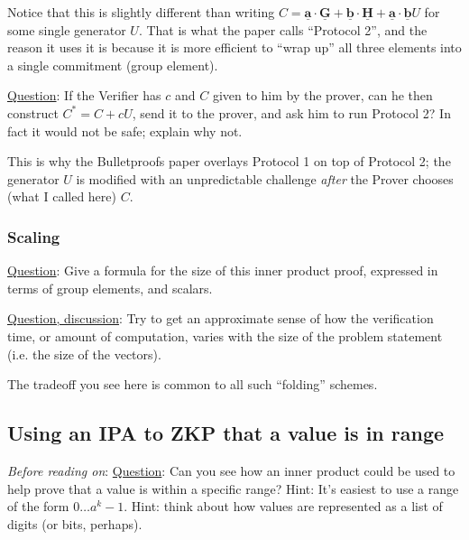 \documentclass[10pt,a4paper]{article}
\begin{document}
\vspace{5 pt}

Notice that this is slightly different than writing $C = \underline{\textbf{a}} \cdot \underline{\textbf{G}} + \underline{\textbf{b}} \cdot \underline{\textbf{H}} + \underline{\textbf{a}} \cdot \underline{\textbf{b}}U$ for some single generator $U$. That is what the paper calls ``Protocol 2'', and the reason it uses it is because it is more efficient to ``wrap up'' all three elements into a single commitment (group element).

\vspace{5 pt}

\underline{Question}: If the Verifier has $c$ and $C$ given to him by the prover, can he then construct $C^{*} = C + cU$, send it to the prover, and ask him to run Protocol 2? In fact it would not be safe; explain why not.

\vspace{5 pt}

This is why the Bulletproofs paper overlays Protocol 1 on top of Protocol 2; the generator $U$ is modified with an unpredictable challenge \emph{after} the Prover chooses (what I called here) $C$.

\subsubsection{Scaling}

\underline{Question}: Give a formula for the size of this inner product proof, expressed in terms of group elements, and scalars.

\vspace{5 pt}

\underline{Question, discussion}: Try to get an approximate sense of how the verification time, or amount of computation, varies with the size of the problem statement (i.e. the size of the vectors).

\vspace{5 pt}

The tradeoff you see here is common to all such ``folding'' schemes.

\subsection{Using an IPA to ZKP that a value is in range}

\emph{Before reading on}: \underline{Question}: Can you see how an inner product could be used to help prove that a value is within a specific range? Hint: It's easiest to use a range of the form $0 \ldots a^k - 1$. Hint: think about how values are represented as a list of digits (or bits, perhaps).
\end{document}
